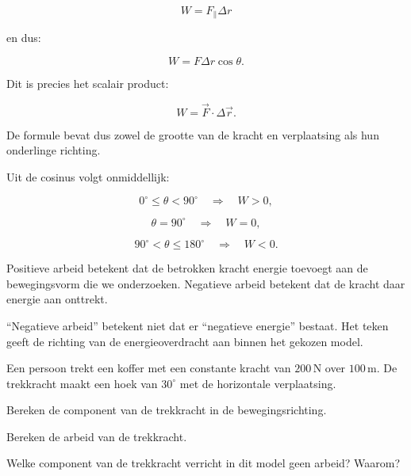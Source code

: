 \documentclass{ximera}
\begin{document}
\[
W=F_\parallel\Delta r
\]

en dus:

\[
\boxed{
W=F\Delta r\cos\theta.
}
\]

Dit is precies het scalair product:

\[
\boxed{
W=\vec F\cdot\Delta\vec r.
}
\]

De formule bevat dus zowel de grootte van de kracht en verplaatsing als hun
onderlinge richting.



Uit de cosinus volgt onmiddellijk:

\[
0^\circ\leq\theta<90^\circ
\quad\Rightarrow\quad
W>0,
\]

\[
\theta=90^\circ
\quad\Rightarrow\quad
W=0,
\]

\[
90^\circ<\theta\leq180^\circ
\quad\Rightarrow\quad
W<0.
\]

Positieve arbeid betekent dat de betrokken kracht energie toevoegt aan de
bewegingsvorm die we onderzoeken. Negatieve arbeid betekent dat de kracht
daar energie aan onttrekt.

\begin{opmerking}
``Negatieve arbeid'' betekent niet dat er ``negatieve energie'' bestaat.
Het teken geeft de richting van de energieoverdracht aan binnen het gekozen
model.
\end{opmerking}


\begin{oefening}{\oefB\ESS}

Een persoon trekt een koffer met een constante kracht van $200\,\mathrm N$
over $100\,\mathrm m$. De trekkracht maakt een hoek van $30^\circ$ met de
horizontale verplaatsing.

\begin{question}
Bereken de component van de trekkracht in de bewegingsrichting.
\end{question}

\begin{question}
Bereken de arbeid van de trekkracht.
\end{question}

\begin{question}
Welke component van de trekkracht verricht in dit model geen arbeid?
Waarom?
\end{question}

\end{oefening}
\end{document}
